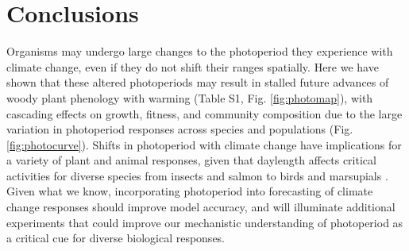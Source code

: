 \documentclass{article}
\begin{document}
\section*{Conclusions}
Organisms may undergo large changes to the photoperiod they experience with climate change, even if they do not shift their ranges spatially. Here we have shown that these altered photoperiods may result in stalled future advances of woody plant phenology with warming (Table S1, Fig. \ref{fig:photomap}), with cascading effects on growth, fitness, and community composition due to the large variation in photoperiod responses across species and populations (Fig. \ref{fig:photocurve}). Shifts in photoperiod with climate change have implications for a variety of plant and animal responses, given that daylength affects critical activities for diverse species from insects \citep{bradshaw2006,linn1996} and salmon \citep{solbakken1994,taranger2003} to birds \citep{dawson2001} and marsupials \citep{mcallan2006,solbakken1994}. Given what we know, incorporating photoperiod into forecasting of climate change responses should improve model accuracy, and will illuminate additional experiments that could improve our mechanistic understanding of photoperiod as a critical cue for diverse biological responses. 
\end{document}
